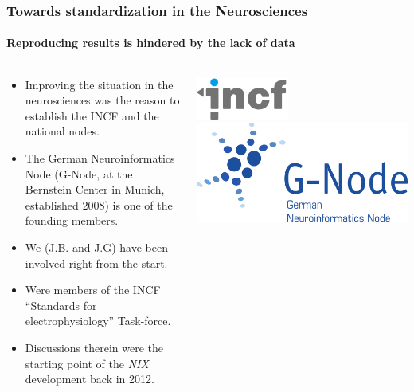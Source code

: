\documentclass[pdftex, xcolor=table]{beamer}
\newcommand{\nix}{\textit{NIX}}
\begin{document}
\begin{frame}
  \frametitle{Towards standardization in the Neurosciences}
  \framesubtitle{Reproducing results is hindered by the lack of data}
  \begin{columns}
    \begin{column}{8cm}
      \begin{itemize}
      \item Improving the situation in the neurosciences was the reason
        to establish the INCF and the national nodes.
      \item The German Neuroinformatics Node (G-Node, at the Bernstein
        Center in Munich, established 2008) is one of the founding members.
      \item We (J.B. and J.G) have been involved right from the start.
      \item Were members of the INCF ``Standards for electrophysiology'' Task-force.
      \item Discussions therein were the starting point of the \nix{}
        development back in 2012.
      \end{itemize}
    \end{column}
    \begin{column}{4cm}
      \includegraphics[width=0.8\columnwidth]{images/incf_logo.png}\\
      \vspace{5ex}
      \includegraphics[width=0.8\columnwidth]{images/g-node_logo.png}
    \end{column}
  \end{columns}
\end{frame}
\end{document}
